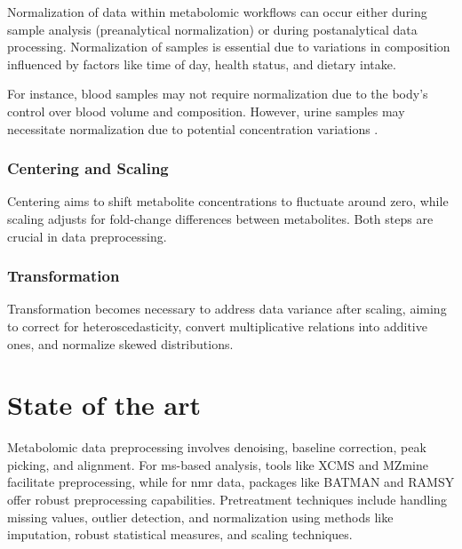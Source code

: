 \documentclass[ENG, BIB]{TFUOC}%
\begin{document}
Normalization of data within metabolomic workflows can occur either during sample analysis (preanalytical normalization) or during postanalytical data processing. Normalization of samples is essential due to variations in composition influenced by factors like time of day, health status, and dietary intake. 

For instance, blood samples may not require normalization due to the body's control over blood volume and composition. However, urine samples may necessitate normalization due to potential concentration variations \cite{ulaszewskaNutrimetabolomicsIntegrativeAction2019a}.


\subsubsection{Centering and Scaling}

 Centering aims to shift metabolite concentrations to fluctuate around zero, while scaling adjusts for fold-change differences between metabolites. Both steps are crucial in data preprocessing.

\subsubsection[Transf]{Transformation}

Transformation becomes necessary to address data variance after scaling, aiming to correct for heteroscedasticity, convert multiplicative relations into additive ones, and normalize skewed distributions.

\section{State of the art}


Metabolomic data preprocessing involves denoising, baseline correction, peak picking, and alignment. For \acrshort{ms}-based analysis, tools like XCMS and MZmine facilitate preprocessing, while for \acrshort{nmr} data, packages like BATMAN and RAMSY offer robust preprocessing capabilities. Pretreatment techniques include handling missing values, outlier detection, and normalization using methods like imputation, robust statistical measures, and scaling techniques.
\end{document}
